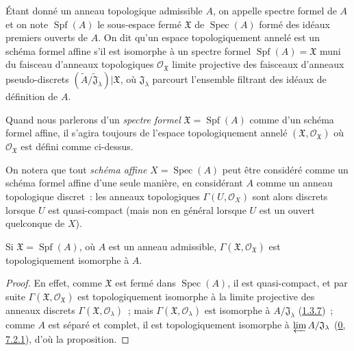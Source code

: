 \begin{definition}[10.1.2]
\label{I.10.1.2-fr}
Étant donné un anneau topologique admissible $A$, on appelle spectre formel
de $A$ et on note $\operatorname{Spf}(A)$ le sous-espace fermé
$\mathfrak{X}$ de $\operatorname{Spec}(A)$ formé des idéaux premiers
ouverts de $A$. On dit qu'un espace topologiquement annelé est un schéma
formel affine s'il est isomorphe à un spectre formel
$\operatorname{Spf}(A)=\mathfrak{X}$ muni du faisceau d'anneaux
topologiques $\mathscr{O}_{\mathfrak{X}}$ limite projective des faisceaux
d'anneaux pseudo-discrets
$(\widetilde{A}/\widetilde{\mathfrak{J}}_\lambda)|\mathfrak{X}$, où
$\mathfrak{J}_\lambda$ parcourt l'ensemble filtrant des idéaux de
définition de $A$.
\end{definition}

Quand nous parlerons d'un \emph{spectre formel}
$\mathfrak{X}=\operatorname{Spf}(A)$ comme d'un schéma formel affine, il
s'agira toujours de l'espace topologiquement annelé
$(\mathfrak{X},\mathscr{O}_{\mathfrak{X}})$ où
$\mathscr{O}_{\mathfrak{X}}$ est défini comme ci-dessus.

On notera que tout \emph{schéma affine} $X=\operatorname{Spec}(A)$ peut être
considéré comme un schéma formel affine d'une seule manière, en considérant
$A$ comme un anneau topologique discret~: les anneaux topologiques
$\Gamma(U,\mathscr{O}_X)$ sont alors discrets lorsque $U$ est
quasi-compact (mais non en général lorsque $U$ est un ouvert quelconque de
$X$).

\begin{proposition}[10.1.3]
\label{I.10.1.3-fr}
Si $\mathfrak{X}=\operatorname{Spf}(A)$, où $A$ est un anneau admissible,
$\Gamma(\mathfrak{X},\mathscr{O}_{\mathfrak{X}})$ est topologiquement
isomorphe à $A$.
\end{proposition}

\begin{proof}
En effet, comme $\mathfrak{X}$ est fermé dans $\operatorname{Spec}(A)$, il
est quasi-compact, et par suite
$\Gamma(\mathfrak{X},\mathscr{O}_{\mathfrak{X}})$ est topologiquement
isomorphe à la limite projective des anneaux discrets
$\Gamma(\mathfrak{X},\mathscr{O}_\lambda)$~; mais
$\Gamma(\mathfrak{X},\mathscr{O}_\lambda)$ est isomorphe à
$A/\mathfrak{J}_\lambda$ (\hyperref[I.1.3.7-fr]{1.3.7})~; comme $A$ est
séparé et complet, il est topologiquement isomorphe à
$\varprojlim A/\mathfrak{J}_\lambda$
(\hyperref[0.7.2.1-fr]{0, 7.2.1}), d'où la proposition.
\end{proof}

